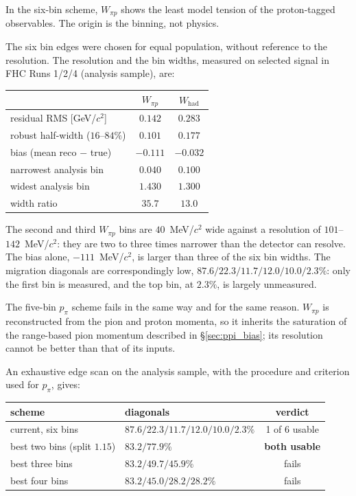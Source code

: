 \documentclass[11pt,a4paper]{article}
\begin{document}
In the six-bin scheme, $W_{\pi p}$ shows the least model tension of the proton-tagged
observables. The origin is the binning, not physics.

The six bin edges were chosen for equal population, without reference to the resolution.
The resolution and the bin widths, measured on selected signal in FHC Runs 1/2/4 (analysis sample), are:

\begin{center}\small
\begin{tabular}{lcc}
\toprule
 & $W_{\pi p}$ & $W_\mathrm{had}$ \\\midrule
residual RMS [GeV/$c^2$]           & $0.142$ & $0.283$ \\
robust half-width ($16$--$84\%$)   & $0.101$ & $0.177$ \\
bias (mean reco $-$ true)          & $\mathbf{-0.111}$ & $-0.032$ \\\midrule
narrowest analysis bin             & $\mathbf{0.040}$ & $0.100$ \\
widest analysis bin                & $1.430$ & $1.300$ \\
width ratio                        & $\mathbf{35.7}$ & $13.0$ \\
\bottomrule
\end{tabular}
\end{center}

\noindent The second and third $W_{\pi p}$ bins are $40$~MeV/$c^2$ wide against a resolution
of $101$--$142$~MeV/$c^2$: they are two to three times narrower than the detector can
resolve. The bias alone, $-111$~MeV/$c^2$, is larger than three of the six bin widths. The
migration diagonals are correspondingly low, $87.6/22.3/11.7/12.0/10.0/2.3\%$: only the
first bin is measured, and the top bin, at $2.3\%$, is largely unmeasured.

The five-bin $p_\pi$ scheme fails in the same way and for the same reason. $W_{\pi p}$ is
reconstructed from the pion and proton momenta, so it inherits the saturation of the
range-based pion momentum described in \S\ref{sec:ppi_bias}; its resolution cannot be
better than that of its inputs.

An exhaustive edge scan on the analysis sample, with the procedure and criterion used for $p_\pi$,
gives:

\begin{center}\small
\begin{tabular}{llc}
\toprule
scheme & diagonals & verdict \\\midrule
current, six bins            & $87.6 / 22.3 / 11.7 / 12.0 / 10.0 / 2.3\%$ & 1 of 6 usable \\
best two bins (split $1.15$) & $\mathbf{83.2 / 77.9\%}$ & \textbf{both usable} \\
best three bins              & $83.2 / 49.7 / 45.9\%$ & fails \\
best four bins               & $83.2 / 45.0 / 28.2 / 28.2\%$ & fails \\
\bottomrule
\end{tabular}
\end{center}
\end{document}
